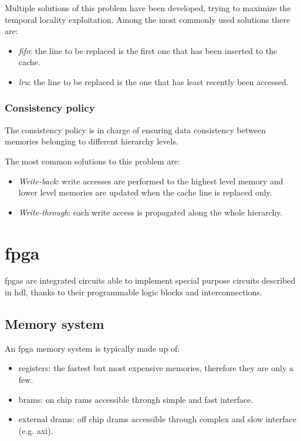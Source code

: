 \documentclass[11pt,a4paper,oneside]{memoir}
\begin{document}
Multiple solutions of this problem have been developed, trying to maximize
the temporal locality exploitation.
Among the most commonly used solutions there are:
\begin{itemize}
	\item \emph{\acl{fifo}}: the line to be replaced is the first
		one that has been inserted to the cache.
	\item \emph{\acl{lru}}: the line to be replaced is the one
		that has least recently been accessed.
\end{itemize}

\subsubsection{Consistency policy}
The consistency policy is in charge of ensuring data consistency between
memories belonging to different hierarchy levels.

The most common solutions to this problem are:
\begin{itemize}
	\item \emph{Write-back}: write accesses are performed to the highest
		level memory and lower level memories are updated when the cache
		line is replaced only.
	\item \emph{Write-through}: each write access is propagated along the
		whole hierarchy.
\end{itemize}

\section{\acl{fpga}}
\aclp{fpga} are integrated circuits able to implement special purpose circuits
described in \ac{hdl}, thanks to their programmable logic blocks and
interconnections.
\subsection{Memory system}
An \ac{fpga} memory system is typically made up of:
\begin{itemize}
	\item registers: the fastest but most expensive memories, therefore
		they are only a few.
	\item \acp{bram}: on chip \acp{ram} accessible through simple and fast
		interface.
	\item external \acp{dram}: off chip \acp{dram} accessible through
		complex and slow interface (e.g. \acs{axi}).
\end{itemize}
\end{document}
